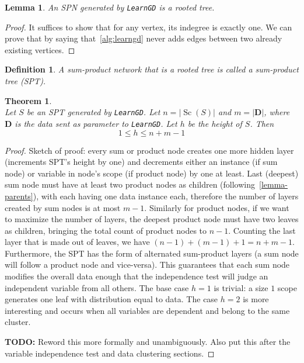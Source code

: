 \documentclass{amsart}
\DeclareMathOperator*{\Sc}{\text{Sc}}
\theoremstyle{plain}
\newcounter{dummy-def}\numberwithin{dummy-def}{section}
\newtheorem{definition}[dummy-def]{Definition}
\newcounter{dummy-thm}\numberwithin{dummy-thm}{section}
\newtheorem{theorem}[dummy-thm]{Theorem}
\newcounter{dummy-prop}\numberwithin{dummy-prop}{section}
\newcounter{dummy-corollary}\numberwithin{dummy-corollary}{section}
\newcounter{dummy-lemma}\numberwithin{dummy-lemma}{section}
\newtheorem{lemma}[dummy-lemma]{Lemma}
\newcounter{dummy-ex}\numberwithin{dummy-ex}{section}
\newcounter{dummy-eg}\numberwithin{dummy-eg}{section}
\numberwithin{equation}{section}
\newcommand{\set}[1]{\mathbf{#1}}
\newcommand{\code}[1]{\lstinline[mathescape=true]{#1}}
\begin{document}
\begin{lemma}
  An SPN generated by \code{LearnGD} is a rooted tree.
\end{lemma}
\begin{proof}
  It suffices to show that for any vertex, its indegree is exactly one. We can prove that by saying
  that~\autoref{alg:learngd} never adds edges between two already existing vertices.
\end{proof}

\begin{definition}
  A sum-product network that is a rooted tree is called a sum-product tree (SPT).
\end{definition}

\begin{theorem}~\\
  Let $S$ be an SPT generated by \code{LearnGD}. Let $n=|\Sc(S)|$ and $m=|\set{D}|$, where
  $\set{D}$ is the data sent as parameter to \code{LearnGD}. Let $h$ be the height of $S$. Then
  \begin{equation*}
    1 \leq h \leq n + m - 1
  \end{equation*}
\end{theorem}
\begin{proof}
  Sketch of proof: every sum or product node creates one more hidden layer (increments SPT's height
  by one) and decrements either an instance (if sum node) or variable in node's scope (if product
  node) by one at least. Last (deepest) sum node must have at least two product nodes as children
  (following~\autoref{lemma-parents}), with each having one data instance each, therefore the
  number of layers created by sum nodes is at most $m-1$. Similarly for product nodes, if we want
  to maximize the number of layers, the deepest product node must have two leaves as children,
  bringing the total count of product nodes to $n-1$. Counting the last layer that is made out of
  leaves, we have $(n-1)+(m-1)+1=n+m-1$. Furthermore, the SPT has the form of alternated
  sum-product layers (a sum node will follow a product node and vice-versa). This guarantees that
  each sum node modifies the overall data enough that the independence test will judge an
  independent variable from all others. The base case $h=1$ is trivial: a size $1$ scope generates
  one leaf with distribution equal to data. The case $h=2$ is more interesting and occurs when all
  variables are dependent and belong to the same cluster.

  \textbf{TODO:} Reword this more formally and unambiguously. Also put this after the variable
  independence test and data clustering sections.
\end{proof}
\end{document}
